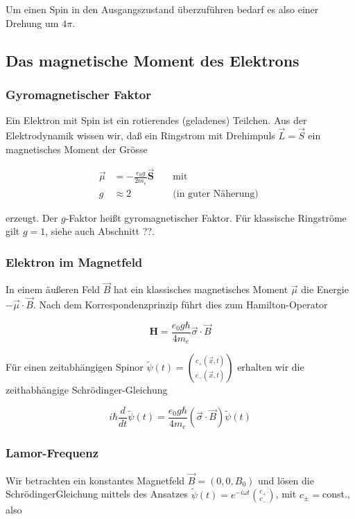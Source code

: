 \documentclass[10pt, letterpaper]{article}
\begin{document}
Um einen Spin in den Ausgangszustand überzuführen bedarf es also einer Drehung um $4 \pi$.

\subsection*{Das magnetische Moment des Elektrons}
\subsubsection*{Gyromagnetischer Faktor}
Ein Elektron mit Spin ist ein rotierendes (geladenes) Teilchen. Aus der Elektrodynamik wissen wir, daß ein Ringstrom mit Drehimpuls $\vec{L}=\vec{S}$ ein magnetisches Moment der Grösse

$$
\begin{aligned}
\vec{\mu} & =-\frac{e_{0} g}{2 m_{e}} \overrightarrow{\mathbf{S}} & & \text { mit } \\
g & \approx 2 & & \text { (in guter Näherung) }
\end{aligned}
$$

erzeugt. Der $g$-Faktor heißt gyromagnetischer Faktor. Für klassische Ringströme gilt $g=1$, siehe auch Abschnitt ??.

\subsubsection*{Elektron im Magnetfeld}
In einem äußeren Feld $\vec{B}$ hat ein klassisches magnetisches Moment $\vec{\mu}$ die Energie $-\vec{\mu} \cdot \vec{B}$. Nach dem Korrespondenzprinzip führt dies zum Hamilton-Operator

$$
\mathbf{H}=\frac{e_{0} g \hbar}{4 m_{e}} \vec{\sigma} \cdot \vec{B}
$$

Für einen zeitabhängigen Spinor $\tilde{\psi}(t)=\binom{c_{+}(\vec{x}, t)}{c_{-}(\vec{x}, t)}$ erhalten wir die zeithabhängige Schrödinger-Gleichung

$$
i \hbar \frac{d}{d t} \tilde{\psi}(t)=\frac{e_{0} g \hbar}{4 m_{e}}(\vec{\sigma} \cdot \vec{B}) \tilde{\psi}(t)
$$

\subsubsection*{Lamor-Frequenz}
Wir betrachten ein konstantes Magnetfeld $\vec{B}=\left(0,0, B_{0}\right)$ und lösen die SchrödingerGleichung mittels des Ansatzes $\tilde{\psi}(t)=e^{-i \omega t}\binom{c_{+}}{c_{-}}$, mit $c_{ \pm}=$const., also
\end{document}
